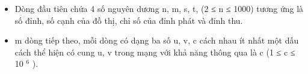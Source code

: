 \begin{itemize}
	\item     Dòng đầu tiên chứa 4 số nguyên dương n, m, s, t, (2 ≤ n ≤ 1000) tương ứng là số đỉnh, số cạnh của đồ thị, chỉ số của đỉnh phát và đỉnh thu.   
	\item     m dòng tiếp theo, mỗi dòng có dạng ba số u, v, c cách nhau ít nhất một dấu cách thể hiện có cung u, v trong mạng với khả năng thông qua là c (1 ≤ c ≤ 10    $^     6    $    ).   
\end{itemize}

\